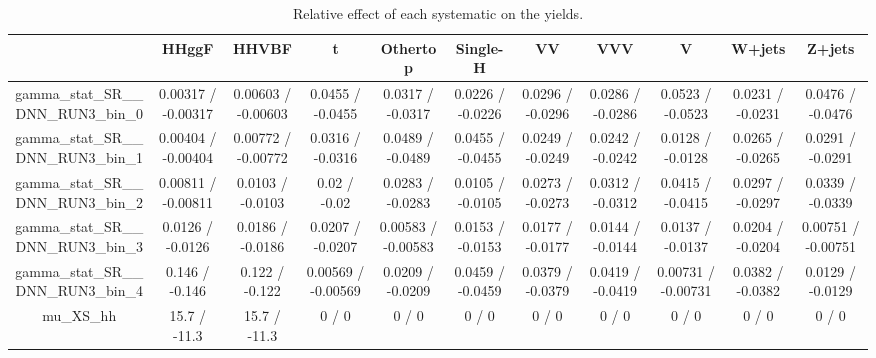 \documentclass[10pt]{article}
\begin{document}
\begin{table}[htbp]
\begin{center}
\begin{tabular}{|c|c|c|c|c|c|c|c|c|c|c|}
\hline 
      & HHggF      & HHVBF      & t      & Othertop      & Single-H      & VV      & VVV      & V      & W+jets      & Z+jets \\ 
\hline 
  gamma_stat_SR__DNN_RUN3_bin_0 & 0.00317 / -0.00317 & 0.00603 / -0.00603 & 0.0455 / -0.0455 & 0.0317 / -0.0317 & 0.0226 / -0.0226 & 0.0296 / -0.0296 & 0.0286 / -0.0286 & 0.0523 / -0.0523 & 0.0231 / -0.0231 & 0.0476 / -0.0476 \\ 
  gamma_stat_SR__DNN_RUN3_bin_1 & 0.00404 / -0.00404 & 0.00772 / -0.00772 & 0.0316 / -0.0316 & 0.0489 / -0.0489 & 0.0455 / -0.0455 & 0.0249 / -0.0249 & 0.0242 / -0.0242 & 0.0128 / -0.0128 & 0.0265 / -0.0265 & 0.0291 / -0.0291 \\ 
  gamma_stat_SR__DNN_RUN3_bin_2 & 0.00811 / -0.00811 & 0.0103 / -0.0103 & 0.02 / -0.02 & 0.0283 / -0.0283 & 0.0105 / -0.0105 & 0.0273 / -0.0273 & 0.0312 / -0.0312 & 0.0415 / -0.0415 & 0.0297 / -0.0297 & 0.0339 / -0.0339 \\ 
  gamma_stat_SR__DNN_RUN3_bin_3 & 0.0126 / -0.0126 & 0.0186 / -0.0186 & 0.0207 / -0.0207 & 0.00583 / -0.00583 & 0.0153 / -0.0153 & 0.0177 / -0.0177 & 0.0144 / -0.0144 & 0.0137 / -0.0137 & 0.0204 / -0.0204 & 0.00751 / -0.00751 \\ 
  gamma_stat_SR__DNN_RUN3_bin_4 & 0.146 / -0.146 & 0.122 / -0.122 & 0.00569 / -0.00569 & 0.0209 / -0.0209 & 0.0459 / -0.0459 & 0.0379 / -0.0379 & 0.0419 / -0.0419 & 0.00731 / -0.00731 & 0.0382 / -0.0382 & 0.0129 / -0.0129 \\ 
  mu_XS_hh & 15.7 / -11.3 & 15.7 / -11.3 & 0 / 0 & 0 / 0 & 0 / 0 & 0 / 0 & 0 / 0 & 0 / 0 & 0 / 0 & 0 / 0 \\ 
\hline 
\end{tabular} 
\caption{Relative effect of each systematic on the yields.} 
\end{center} 
\end{table} 
\end{document}
